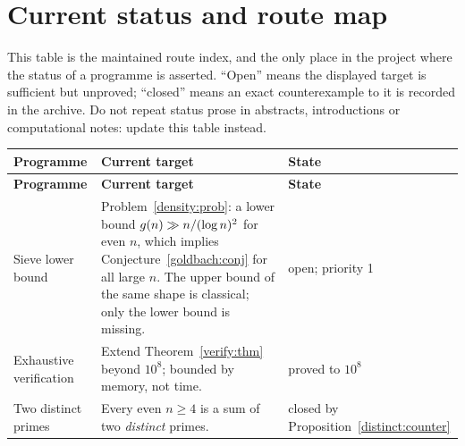 \section{Current status and route map}\label{sec:status}

This table is the maintained route index, and the only place in the project
where the status of a programme is asserted.  ``Open'' means the displayed
target is sufficient but unproved; ``closed'' means an exact counterexample to
it is recorded in the archive.  Do not repeat status prose in abstracts,
introductions or computational notes: update this table instead.

\begingroup
\small
\renewcommand{\arraystretch}{1.12}
\begin{longtable}{@{}>{\raggedright\arraybackslash}p{}
                       >{\raggedright\arraybackslash}p{}
                       >{\raggedright\arraybackslash}p{}@{}}
\textbf{Programme} & \textbf{Current target} & \textbf{State}\\ \hline
\endfirsthead
\textbf{Programme} & \textbf{Current target} & \textbf{State}\\ \hline
\endhead
Sieve lower bound &
Problem~\ref{density:prob}: a lower bound $g(n)\gg n/(\log n)^{2}$ for even
$n$, which implies Conjecture~\ref{goldbach:conj} for all large $n$.  The
upper bound of the same shape is classical; only the lower bound is missing. &
open; priority 1\\
Exhaustive verification &
Extend Theorem~\ref{verify:thm} beyond $10^{8}$; bounded by memory, not time. &
proved to $10^{8}$\\
Two distinct primes &
Every even $n\geq4$ is a sum of two \emph{distinct} primes. &
closed by Proposition~\ref{distinct:counter}\\
\end{longtable}
\endgroup
